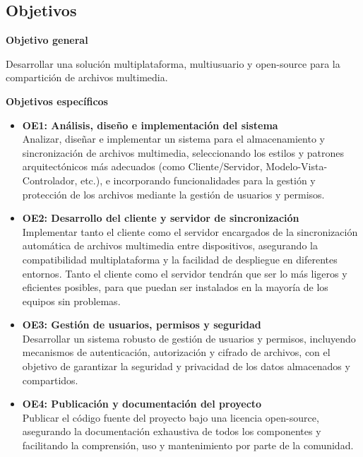 \subsection{Objetivos}

\textbf{Objetivo general}

Desarrollar una solución multiplataforma, multiusuario y open-source para la compartición de archivos multimedia.

\textbf{Objetivos específicos}

\begin{itemize}
    \item \textbf{OE1: Análisis, diseño e implementación del sistema} \\
    Analizar, diseñar e implementar un sistema para el almacenamiento y sincronización de archivos multimedia, seleccionando los estilos y patrones arquitectónicos más adecuados (como Cliente/Servidor, Modelo-Vista-Controlador, etc.), e incorporando funcionalidades para la gestión y protección de los archivos mediante la gestión de usuarios y permisos.

    \item \textbf{OE2: Desarrollo del cliente y servidor de sincronización} \\
    Implementar tanto el cliente como el servidor encargados de la sincronización automática de archivos multimedia entre dispositivos, asegurando la compatibilidad multiplataforma y la facilidad de despliegue en diferentes entornos.
    Tanto el cliente como el servidor tendrán que ser lo más ligeros y eficientes posibles, para que puedan ser instalados en la mayoría de los equipos sin problemas.

    \item \textbf{OE3: Gestión de usuarios, permisos y seguridad} \\
    Desarrollar un sistema robusto de gestión de usuarios y permisos, incluyendo mecanismos de autenticación, autorización y cifrado de archivos, con el objetivo de garantizar la seguridad y privacidad de los datos almacenados y compartidos.

    \item \textbf{OE4: Publicación y documentación del proyecto} \\
    Publicar el código fuente del proyecto bajo una licencia open-source, asegurando la documentación exhaustiva de todos los componentes y facilitando la comprensión, uso y mantenimiento por parte de la comunidad.


\end{itemize}
